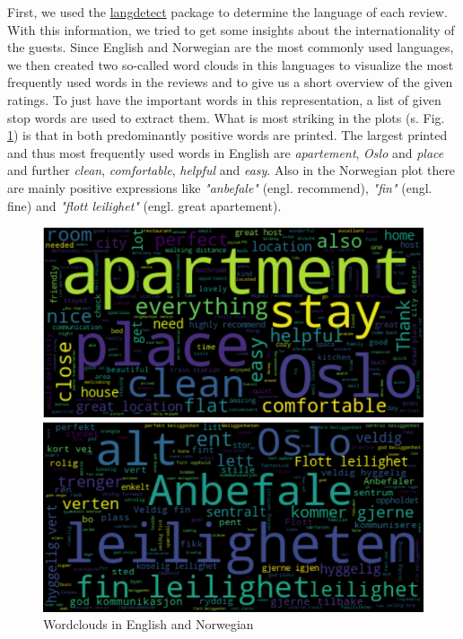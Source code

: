 \documentclass[12pt, letterpaper]{article}
\begin{document}
First, we used the \href{https://pypi.org/project/langdetect/}{langdetect} package to determine the language of each review.
With this information, we tried to get some insights about the internationality of the guests.
Since English and Norwegian are the most commonly used languages, we then created two so-called word clouds in this languages
to visualize the most frequently used words in the reviews and to give us a short overview of the given ratings.
To just have the important words in this representation, a list of given stop words are used to extract them.
What is most striking in the plots (s. Fig. \ref{fig:wordclouds}) is that in both predominantly positive words are printed. The largest printed and thus most frequently used words in English are \textit{apartement}, \textit{Oslo} and \textit{place} and
further \textit{clean}, \textit{comfortable}, \textit{helpful} and \textit{easy}. Also in the Norwegian plot there are mainly positive expressions like \textit{"anbefale"} (engl. recommend), \textit{"fin"} (engl. fine) and \textit{"flott leilighet"} (engl. great apartement).

\begin{figure}[t]
    \centering
    \begin{minipage}{6.7cm}
        \includegraphics[width=\columnwidth]{wordcloud_eng.png}
    \end{minipage}
    \begin{minipage}{6.7cm}
        \includegraphics[width=\columnwidth]{wordcloud_nor.png}
    \end{minipage}
    \caption{Wordclouds in English and Norwegian}
    \label{fig:wordclouds}
\end{figure}
\end{document}
